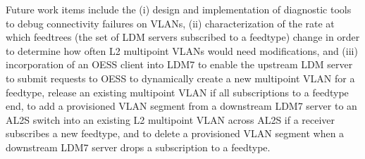 Future work items include the (i) design and implementation of diagnostic tools to debug connectivity failures on VLANs, (ii) characterization of the rate at which feedtrees (the set of LDM servers subscribed to a feedtype) change in order to determine how often L2 multipoint VLANs would need modifications, and (iii) incorporation of an OESS client into LDM7 to enable the upstream LDM server to submit requests to OESS to dynamically create a new multipoint VLAN for a feedtype, release an existing multipoint VLAN if all subscriptions to a feedtype end, to add a provisioned VLAN segment from a downstream LDM7 server to an AL2S switch into an existing L2 multipoint VLAN across AL2S if a receiver subscribes a new feedtype, and to delete a provisioned VLAN segment when a downstream LDM7 server drops a subscription to a feedtype.










